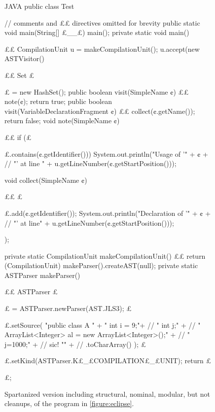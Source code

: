 \begin{figure}
  \caption{Spartanized version including structural, nominal, modular, but
    not cleanups, of the \Java program in \cref{figure:eclipse}.}
  \label{figure:eclipse:spartan}
  \begin{adjustbox}{max width = \columnwidth}
\begin{code}[minipage, width=1.13\columnwidth]{JAVA}
public class Test { // comments and ££ directives omitted for brevity
  public static void main(String[] £\_\_£) { main(); }
  private static void main() {££
    CompilationUnit u = makeCompilationUnit();
    u.accept(new ASTVisitor() {££
      Set £\ignore$£$ = new HashSet();
      public boolean visit(SimpleName ¢) {££
        note(¢);
        return true;
      }
      public boolean visit(VariableDeclarationFragment ¢) {££
        collect(¢.getName());
        return false;
      }
      void note(SimpleName ¢) {££
        if (£\ignore$£$.contains(¢.getIdentifier()))
          System.out.println("Usage of '" + ¢ + //
            "' at line " + u.getLineNumber(¢.getStartPosition()));
      }
      void collect(SimpleName ¢) {££
        £\ignore$£$.add(¢.getIdentifier());
        System.out.println("Declaration of '" + ¢ + //
          "' at line" + u.getLineNumber(¢.getStartPosition()));
      }
    });
  }
  private static CompilationUnit makeCompilationUnit() {££
    return (CompilationUnit) makeParser().createAST(null);
  }
  private static ASTParser makeParser() {££
    ASTParser £\ignore$£$ = ASTParser.newParser(AST.JLS3);
    £\ignore$£$.setSource(
      "public class A {\n" +
      " int i = 9;\n"+ //
      " int j;\n" + //
      " ArrayList<Integer> al = new ArrayList<Integer>();\n" + //
      " j=1000;\n" + // sic!
      "}\n" + //
      .toCharArray()
);
    £\ignore$£$.setKind(ASTParser.K£\_£COMPILATION£\_£UNIT);
    return £\ignore$£$;
  }
}
\end{code}
  \end{adjustbox}
\end{figure}



